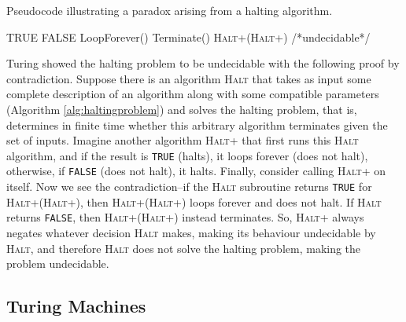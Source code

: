 \documentclass[11pt]{amsart}
\begin{document}
\begin{algorithm}
\caption{Pseudocode illustrating a paradox arising from a halting algorithm.}\label{alg:haltingproblem}
\begin{algorithmic}[1]
\State \Return TRUE
\Else
\State \Return FALSE
\EndIf
\EndProcedure
{}
\State LoopForever()
\Else
\State Terminate()
\EndIf
\EndProcedure
\State \textsc{Halt+}(\textsc{Halt+}) \//*undecidable*\// 
\end{algorithmic}
\end{algorithm}

Turing showed the halting problem to be undecidable with the following proof by contradiction. Suppose there is an algorithm \textsc{Halt} that takes as input some complete description of an algorithm along with some compatible parameters (Algorithm \ref{alg:haltingproblem}) and solves the halting problem, that is, determines in finite time whether this arbitrary algorithm terminates given the set of inputs. Imagine another algorithm \textsc{Halt+} that first runs this \textsc{Halt} algorithm, and if the result is \texttt{TRUE} (halts), it loops forever (does not halt), otherwise, if \texttt{FALSE} (does not halt), it halts. Finally, consider calling \textsc{Halt+} on itself. Now we see the contradiction--if the \textsc{Halt} subroutine returns \texttt{TRUE} for \textsc{Halt+}(\textsc{Halt+}), then \textsc{Halt+}(\textsc{Halt+}) loops forever and does not halt. If \textsc{Halt} returns \texttt{FALSE}, then \textsc{Halt+}(\textsc{Halt+}) instead terminates. So, \textsc{Halt+} always negates whatever decision \textsc{Halt} makes, making its behaviour undecidable by \textsc{Halt}, and therefore \textsc{Halt} does not solve the halting problem, making the problem undecidable.

\subsection{Turing Machines}
\end{document}
